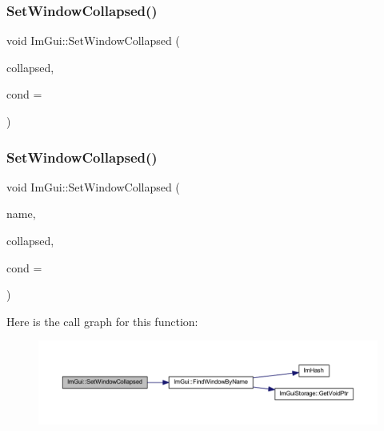 \subsubsection{\texorpdfstring{Set\+Window\+Collapsed()}{SetWindowCollapsed()}\hspace{0.1cm}{\footnotesize\ttfamily [1/2]}}
{\footnotesize\ttfamily void Im\+Gui\+::\+Set\+Window\+Collapsed (\begin{DoxyParamCaption}\item[{bool}]{collapsed,  }\item[{\mbox{\hyperlink{imgui_8h_aef890d6ac872e12c5804d0b3e4f7f103}{Im\+Gui\+Cond}}}]{cond = {} }\end{DoxyParamCaption})}

\mbox{\label{namespace_im_gui_ac349187d6aae141cd3b4476e54bcc338}} 
\subsubsection{\texorpdfstring{Set\+Window\+Collapsed()}{SetWindowCollapsed()}\hspace{0.1cm}{\footnotesize\ttfamily [2/2]}}
{\footnotesize\ttfamily void Im\+Gui\+::\+Set\+Window\+Collapsed (\begin{DoxyParamCaption}\item[{const char $\ast$}]{name,  }\item[{bool}]{collapsed,  }\item[{\mbox{\hyperlink{imgui_8h_aef890d6ac872e12c5804d0b3e4f7f103}{Im\+Gui\+Cond}}}]{cond = {} }\end{DoxyParamCaption})}

Here is the call graph for this function\+:
\nopagebreak
\begin{figure}[H]
\begin{center}
\leavevmode
\includegraphics[width=350pt]{namespace_im_gui_ac349187d6aae141cd3b4476e54bcc338_cgraph}
\end{center}
\end{figure}
\mbox{\label{namespace_im_gui_ac71920931ed7b7c8594ee84c6a94e7b8}} 
